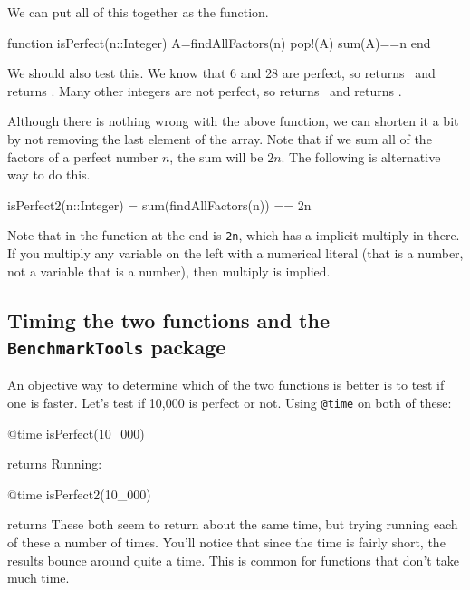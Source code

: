We can put all of this together as the function.
\begin{jlblock}[nt]
function isPerfect(n::Integer)
  A=findAllFactors(n)
  pop!(A)
  sum(A)==n
end
\end{jlblock}

We should also test this.  We know that 6 and 28 are perfect, so  returns \printpythontex[verb]~and  returns \printpythontex[verb].  Many other integers are not perfect, so  returns \printpythontex[verb]~and  returns \printpythontex[verb].

Although there is nothing wrong with the above function, we can shorten it a bit by not removing the last element of the array.  Note that if we sum all of the factors of a perfect number $n$, the sum will be $2n$.  The following is alternative way to do this. 

\begin{jlblock}[nt]
isPerfect2(n::Integer) = sum(findAllFactors(n)) == 2n
\end{jlblock}

Note that in the function at the end is \texttt{2n}, which has a implicit multiply in there.  If you multiply any variable on the left with a numerical literal (that is a number, not a variable that is a number), then multiply is implied.  

\subsection{Timing the two functions and the \texttt{BenchmarkTools} package}

An objective way to determine which of the two functions is better is to test if one is faster.  Let's test if 10,000 is perfect or not.  Using \verb!@time! on both of these:
\begin{jlblock}[nt]
@time isPerfect(10_000)
\end{jlblock}
returns  \printpythontex[verbatim]
%
Running:
\begin{jlblock}[nt]
@time isPerfect2(10_000)
\end{jlblock}
returns  
\printpythontex[verbatim]  
These both seem to return about the same time, but trying running each of these a number of times.  You'll notice that since the time is fairly short, the results bounce around quite a time.  This is common for functions that don't take much time. 

